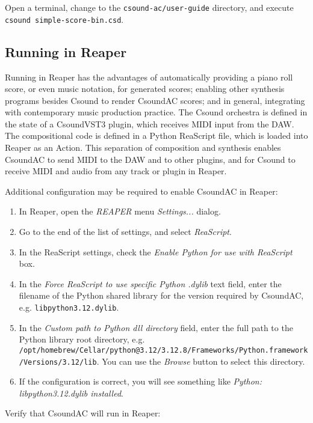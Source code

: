 \documentclass[letterpaper,10pt,DIV=12]{scrartcl}
\begin{document}
Open a terminal, change to the \lstinline|csound-ac/user-guide| directory, and execute \lstinline|csound simple-score-bin.csd|.

\subsection{Running in Reaper}

Running in Reaper has the advantages of automatically providing a piano roll score, or even music notation, for generated scores; enabling other synthesis programs besides Csound to render CsoundAC scores; and in general, integrating with contemporary music production practice. The Csound orchestra is defined in the state of a CsoundVST3 plugin, which receives MIDI input from the DAW. The compositional code is defined in a Python ReaScript file, which is loaded into Reaper as an Action. This separation of composition and synthesis enables CsoundAC to send MIDI to the DAW and to other plugins, and for Csound to receive MIDI and audio from any track or plugin in Reaper.

Additional configuration may be required to enable CsoundAC in Reaper:

\begin{enumerate}
\item In Reaper, open the \emph{REAPER} menu \emph{Settings...} dialog.
\item Go to the end of the list of settings, and select \emph{ReaScript}.
\item In the ReaScript settings, check the \emph{Enable Python for use with ReaScript} box.
\item In the \emph{Force ReaScript to use specific Python .dylib} text field, enter the filename of the Python shared library for the version required by CsoundAC, e.g. \lstinline|libpython3.12.dylib|. 
\item In the \emph{Custom path to Python dll directory} field, enter the full path to the Python library root directory, e.g. \lstinline|/opt/homebrew/Cellar/python@3.12/3.12.8/Frameworks/Python.framework/Versions/3.12/lib|. You can use the \emph{Browse} button to select this directory.
\item If the configuration is correct, you will see something like \emph{Python: libpython3.12.dylib installed}.
\end{enumerate}

\noindent Verify that CsoundAC will run in Reaper:
\end{document}
